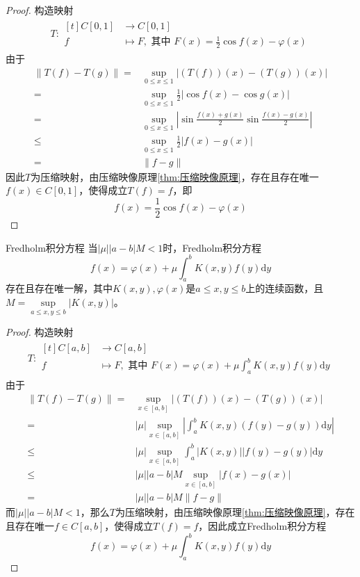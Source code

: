 \documentclass[lang = cn, scheme = chinese, thmcnt = section]{elegantbook}
\begin{document}
\begin{proof}
	构造映射
	\begin{align*}
		T:\begin{aligned}[t]
			C[0,1]&\longrightarrow C[0,1]\\
			f&\longmapsto F,\text{ 其中 }F(x)=\frac{1}{2}\cos f(x)-\varphi(x)
		\end{aligned}
	\end{align*}
	由于
	\begin{align*}
		\|T(f)-T(g)\|=&\sup_{0\le x\le 1}|(T(f))(x)-(T(g))(x)|\\
		= & \sup_{0\le x\le 1}\frac{1}{2}|\cos f(x)-\cos g(x)|\\
		= & \sup_{0\le x\le 1}\left|\sin\frac{f(x)+g(x)}{2}\sin\frac{f(x)-g(x)}{2}\right|\\
		\le & \sup_{0\le x\le 1}\frac{1}{2}|f(x)-g(x)|\\
		= & \|f-g\|
	\end{align*}
	因此$T$为压缩映射，由压缩映像原理\ref{thm:压缩映像原理}，存在且存在唯一$f(x)\in C[0,1]$，使得成立$T(f)=f$，即
	$$
	f(x)=\frac{1}{2}\cos f(x)-\varphi(x)
	$$
\end{proof}

\begin{proposition}{Fredholm积分方程}
	当$|\mu||a-b|M<1$时，Fredholm积分方程
	$$
	f(x)=\varphi(x)+\mu\int_a^bK(x,y)f(y)\mathrm{d}y
	$$
	存在且存在唯一解，其中$K(x,y),\varphi(x)$是$a\le x,y\le b$上的连续函数，且$M=\sup\limits_{a\le x,y\le b}|K(x,y)|$。
\end{proposition}

\begin{proof}
	构造映射
	\begin{align*}
		T:\begin{aligned}[t]
			C[a,b]&\longrightarrow C[a,b]\\
			f&\longmapsto F,\text{ 其中 }F(x)=\varphi(x)+\mu\int_a^bK(x,y)f(y)\mathrm{d}y
		\end{aligned}
	\end{align*}
	由于
	\begin{align*}
		\|T(f)-T(g)\|
		=&\sup_{x\in[a,b]}|(T(f))(x)-(T(g))(x)|\\
		=&|\mu|\sup_{x\in[a,b]}\left| \int_a^bK(x,y)(f(y)-g(y))\mathrm{d}y \right|\\
		\le & |\mu|\sup_{x\in[a,b]}\int_a^b|K(x,y)||f(y)-g(y)|\mathrm{d}y\\
		\le & |\mu||a-b|M\sup_{x\in[a,b]}|f(x)-g(x)|\\
		=& |\mu||a-b|M\|f-g\|
	\end{align*}
	而$|\mu||a-b|M<1$，那么$T$为压缩映射，由压缩映像原理\ref{thm:压缩映像原理}，存在且存在唯一$f\in C[a,b]$，使得成立$T(f)=f$​，因此成立Fredholm积分方程
	$$
	f(x)=\varphi(x)+\mu\int_a^bK(x,y)f(y)\mathrm{d}y
	$$
\end{proof}
\end{document}
